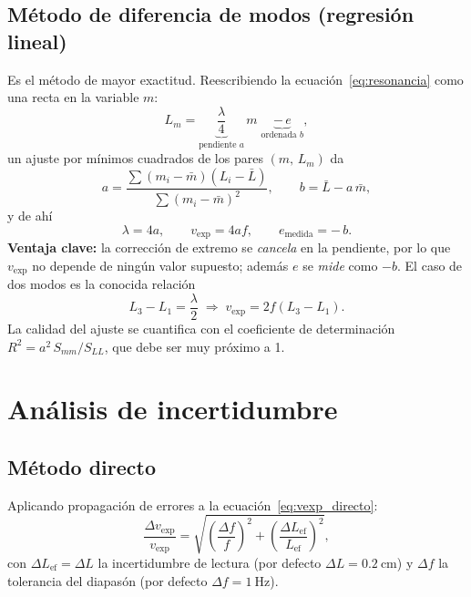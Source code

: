 \documentclass[11pt,a4paper]{article}
\newcommand{\vexp}{v_{\text{exp}}}
\begin{document}
\subsection{Método de diferencia de modos (regresión lineal)}\label{sec:regresion}
Es el método de mayor exactitud. Reescribiendo la ecuación~\eqref{eq:resonancia} como una recta
en la variable $m$:
\begin{equation}
  L_m = \underbrace{\frac{\lambda}{4}}_{\text{pendiente } a}\,m \;\underbrace{-\,e}_{\text{ordenada } b},
\end{equation}
un ajuste por mínimos cuadrados de los pares $(m,\,L_m)$ da
\begin{equation}
  a = \frac{\sum (m_i-\bar m)(L_i-\bar L)}{\sum (m_i-\bar m)^2},
  \qquad b = \bar L - a\,\bar m,
\end{equation}
y de ahí
\begin{equation}
  \boxed{\;\lambda = 4a,\qquad \vexp = 4 a f,\qquad e_{\text{medida}} = -\,b.\;}
  \label{eq:reg}
\end{equation}
\textbf{Ventaja clave:} la corrección de extremo se \emph{cancela} en la pendiente, por lo que
$\vexp$ no depende de ningún valor supuesto; además $e$ se \emph{mide} como
$-b$. El caso de dos modos es la conocida relación
\begin{equation}
  L_3 - L_1 = \frac{\lambda}{2}\;\Rightarrow\; \vexp = 2 f (L_3-L_1).
\end{equation}
La calidad del ajuste se cuantifica con el coeficiente de determinación
$R^2 = a^2\,S_{mm}/S_{LL}$, que debe ser muy próximo a 1.

\section{Análisis de incertidumbre}

\subsection{Método directo}
Aplicando propagación de errores a la ecuación~\eqref{eq:vexp_directo}:
\begin{equation}
  \frac{\Delta\vexp}{\vexp} = \sqrt{\left(\frac{\Delta f}{f}\right)^2
  + \left(\frac{\Delta L_{\text{ef}}}{L_{\text{ef}}}\right)^2},
  \label{eq:prop}
\end{equation}
con $\Delta L_{\text{ef}}=\Delta L$ la incertidumbre de lectura (por defecto
$\Delta L=\SI{0.2}{\centi\meter}$) y $\Delta f$ la tolerancia del diapasón
(por defecto $\Delta f=\SI{1}{\hertz}$).
\end{document}
